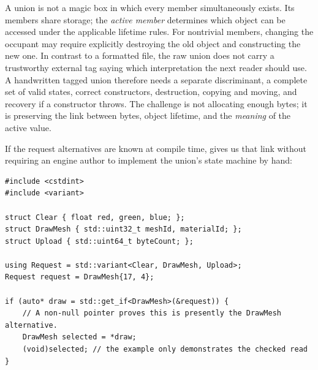 A union is not a magic box in which every member simultaneously exists. Its members share storage; the \emph{active member} determines which object can be accessed under the applicable lifetime rules. For nontrivial members, changing the occupant may require explicitly destroying the old object and constructing the new one. In contrast to a formatted file, the raw union does not carry a trustworthy external tag saying which interpretation the next reader should use. A handwritten tagged union therefore needs a separate discriminant, a complete set of valid states, correct constructors, destruction, copying and moving, and recovery if a constructor throws. The challenge is not allocating enough bytes; it is preserving the link between bytes, object lifetime, and the \emph{meaning} of the active value.

If the request alternatives are known at compile time,  gives us that link without requiring an engine author to implement the union's state machine by hand:

\begin{verbatim}
#include <cstdint>
#include <variant>

struct Clear { float red, green, blue; };
struct DrawMesh { std::uint32_t meshId, materialId; };
struct Upload { std::uint64_t byteCount; };

using Request = std::variant<Clear, DrawMesh, Upload>;
Request request = DrawMesh{17, 4};

if (auto* draw = std::get_if<DrawMesh>(&request)) {
    // A non-null pointer proves this is presently the DrawMesh alternative.
    DrawMesh selected = *draw;
    (void)selected; // the example only demonstrates the checked read
}
\end{verbatim}

